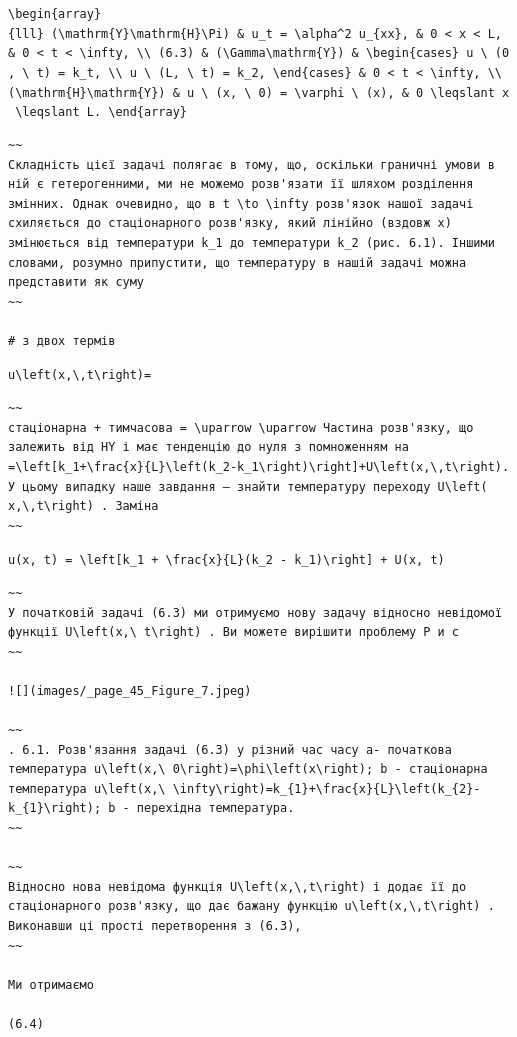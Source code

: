 \documentclass[
  ukrainian,
]{article}
\begin{document}
\texttt{\textbackslash{}begin\{array\}\{lll\}\ (\textbackslash{}mathrm\{Y\}\textbackslash{}mathrm\{H\}\textbackslash{}Pi)\ \&\ u\_t\ =\ \textbackslash{}alpha\^{}2\ u\_\{xx\},\ \&\ 0\ \textless{}\ x\ \textless{}\ L,\ \&\ 0\ \textless{}\ t\ \textless{}\ \textbackslash{}infty,\ \textbackslash{}\textbackslash{}\ (6.3)\ \&\ (\textbackslash{}Gamma\textbackslash{}mathrm\{Y\})\ \&\ \textbackslash{}begin\{cases\}\ u\ \textbackslash{}\ (0,\ \textbackslash{}\ t)\ =\ k\_t,\ \textbackslash{}\textbackslash{}\ u\ \textbackslash{}\ (L,\ \textbackslash{}\ t)\ =\ k\_2,\ \textbackslash{}end\{cases\}\ \&\ 0\ \textless{}\ t\ \textless{}\ \textbackslash{}infty,\ \textbackslash{}\textbackslash{}\ (\textbackslash{}mathrm\{H\}\textbackslash{}mathrm\{Y\})\ \&\ u\ \textbackslash{}\ (x,\ \textbackslash{}\ 0)\ =\ \textbackslash{}varphi\ \textbackslash{}\ (x),\ \&\ 0\ \textbackslash{}leqslant\ x\ \textbackslash{}leqslant\ L.\ \textbackslash{}end\{array\}}

\begin{verbatim}
~~
Складність цієї задачі полягає в тому, що, оскільки граничні умови в ній є гетерогенними, ми не можемо розв'язати її шляхом розділення змінних. Однак очевидно, що в t \to \infty розв'язок нашої задачі схиляється до стаціонарного розв'язку, який лінійно (вздовж x) змінюється від температури k_1 до температури k_2 (рис. 6.1). Іншими словами, розумно припустити, що температуру в нашій задачі можна представити як суму
~~

# з двох термів
\end{verbatim}

\texttt{u\textbackslash{}left(x,\textbackslash{},t\textbackslash{}right)=}

\begin{verbatim}
~~
стаціонарна + тимчасова = \uparrow \uparrow Частина розв'язку, що залежить від HY і має тенденцію до нуля з помноженням на =\left[k_1+\frac{x}{L}\left(k_2-k_1\right)\right]+U\left(x,\,t\right). У цьому випадку наше завдання — знайти температуру переходу U\left( x,\,t\right) . Заміна
~~
\end{verbatim}

\texttt{u(x,\ t)\ =\ \textbackslash{}left{[}k\_1\ +\ \textbackslash{}frac\{x\}\{L\}(k\_2\ -\ k\_1)\textbackslash{}right{]}\ +\ U(x,\ t)}

\begin{verbatim}
~~
У початковій задачі (6.3) ми отримуємо нову задачу відносно невідомої функції U\left(x,\ t\right) . Ви можете вирішити проблему Р и с
~~

![](images/_page_45_Figure_7.jpeg)

~~
. 6.1. Розв'язання задачі (6.3) у різний час часу a- початкова температура u\left(x,\ 0\right)=\phi\left(x\right); b - стаціонарна температура u\left(x,\ \infty\right)=k_{1}+\frac{x}{L}\left(k_{2}-k_{1}\right); b - перехідна температура.
~~

~~
Відносно нова невідома функція U\left(x,\,t\right) і додає її до стаціонарного розв'язку, що дає бажану функцію u\left(x,\,t\right) . Виконавши ці прості перетворення з (6.3),
~~

Ми отримаємо

(6.4)
\end{verbatim}
\end{document}
